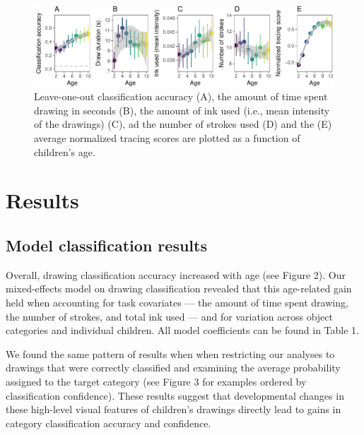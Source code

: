 \documentclass[10pt, letterpaper]{article}
\newenvironment{CodeChunk}{}{}
\begin{document}
\begin{CodeChunk}
\begin{figure}[h]
\includegraphics{figs/mainResults-1} \caption[ Leave-one-out classification accuracy (A), the amount of time spent drawing in seconds (B), the amount of ink used (i.e., mean intensity of the drawings) (C), ad the number of strokes used (D) and the (E) average normalized tracing scores are plotted as a function of children’s age]{ Leave-one-out classification accuracy (A), the amount of time spent drawing in seconds (B), the amount of ink used (i.e., mean intensity of the drawings) (C), ad the number of strokes used (D) and the (E) average normalized tracing scores are plotted as a function of children’s age.}\label{fig:mainResults}
\end{figure}
\end{CodeChunk}

\section{Results}\label{results}

\subsection{Model classification
results}\label{model-classification-results}

Overall, drawing classification accuracy increased with age (see Figure
2). Our mixed-effects model on drawing classification revealed that this
age-related gain held when accounting for task covariates --- the amount
of time spent drawing, the number of strokes, and total ink used --- and
for variation across object categories and individual children. All
model coefficients can be found in Table 1.

We found the same pattern of results when when restricting our analyses
to drawings that were correctly classified and examining the average
probability assigned to the target category (see Figure 3 for examples
ordered by classification confidence). These results suggest that
developmental changes in these high-level visual features of children's
drawings directly lead to gains in category classification accuracy and
confidence.
\end{document}

